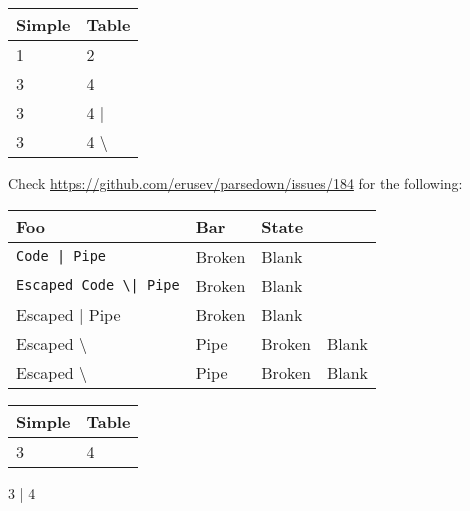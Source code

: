 \noindent\begin{tabular}{|l|l|}\hline
Simple & Table\\ \hline
1      & 2\\ \hline
3      & 4\\ \hline
3      & 4     |\\ \hline
3      & 4    {\textbackslash}\\ \hline
\end{tabular}
Check \url{https://github.com/erusev/parsedown/issues/184} for the following:

\noindent\begin{tabular}{|l|l|l|}\hline
Foo & Bar & State\\ \hline
\lstinline`Code | Pipe` & Broken & Blank\\ \hline
\lstinline`Escaped Code \| Pipe` & Broken & Blank\\ \hline
Escaped | Pipe & Broken & Blank\\ \hline
Escaped {\textbackslash}& Pipe & Broken & Blank\\ \hline
Escaped {\textbackslash} & Pipe & Broken & Blank\\ \hline
\end{tabular}

\noindent\begin{tabular}{|l|l|}\hline
Simple & Table\\ \hline
3      & 4\\ \hline
\end{tabular}
3      | 4

